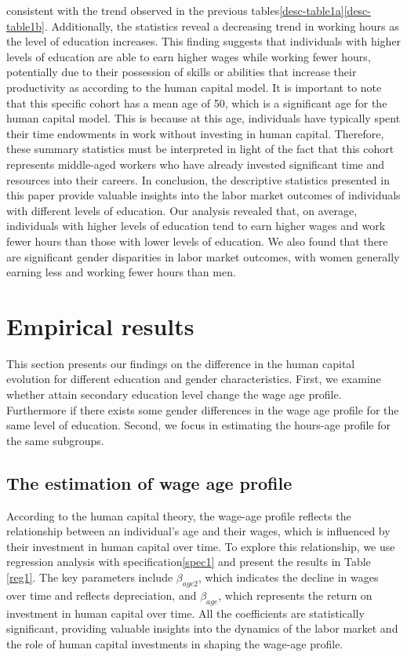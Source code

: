 \documentclass[12pt]{article}
\begin{document}
consistent with the trend observed in the previous  tables\ref{desc-table1a}\ref{desc-table1b}. Additionally, the
statistics reveal a decreasing trend in working hours as the level of education increases. This finding suggests that
individuals with higher levels of education are able to earn higher wages while working fewer hours, potentially due to
their possession of skills or abilities that increase their productivity as according to the human capital model. It is
important to note that this specific cohort has a mean age of 50, which is a significant age for the human capital
model. This is because at this age, individuals have typically spent their time endowments in work without investing in
human capital. Therefore, these summary statistics must be interpreted in light of the fact that this cohort represents
middle-aged workers who have already invested significant time and resources into their careers.\newline
In conclusion, the descriptive statistics presented in this paper provide valuable insights into the labor market
outcomes of individuals with different levels of education. Our analysis revealed that, on average, individuals with
higher levels of education tend to earn higher wages and work fewer hours than those with lower levels of education. We
also found that there are significant gender disparities in labor market outcomes, with women generally earning less and
working fewer hours than men.
\section{Empirical results}
This section presents our findings on the difference in the human capital evolution for different education and gender
characteristics. First, we examine whether attain secondary education level change the wage age profile. Furthermore if
there exists some gender differences in the wage age profile for the same level of education. Second, we focus in
estimating the hours-age profile for the same subgroups.
\subsection{The estimation of wage age profile}
According to the human capital theory, the wage-age profile reflects the relationship between an individual's age and their wages, which is influenced by their investment in human capital over time. To explore this relationship, we use regression analysis with specification\ref{spec1} and present the results in Table \ref{reg1}. The key parameters include $\beta_{age2}$, which indicates the decline in wages over time and reflects depreciation, and $\beta_{age}$, which represents the return on investment in human capital over time. All the coefficients are statistically significant, providing valuable insights into the dynamics of the labor market and the role of human capital investments in shaping the wage-age profile.
\end{document}
